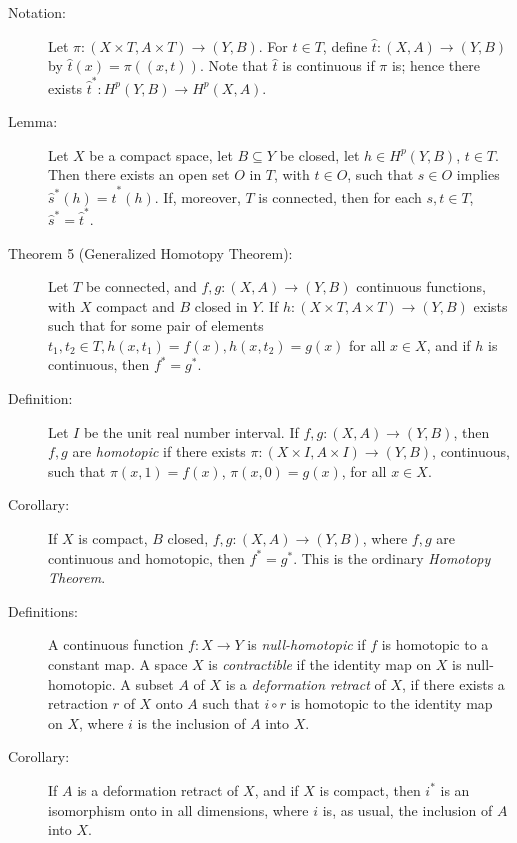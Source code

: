 \documentclass{article}
\begin{document}
\begin{description}
\item[Notation:] Let $\pi: (X \times T, A \times T) \longrightarrow (Y,B)$. For $t \in T$, define $\hat{t}: (X,A) \longrightarrow (Y,B)$ by $\hat{t}(x) = \pi ((x,t))$. Note that $\hat{t}$ is continuous if $\pi$ is; hence there exists $\hat{t}^*: H^p(Y,B) \rightarrow H^p(X,A)$.

\item[Lemma:] Let $X$ be a compact space, let $B \subseteq Y$ be closed, let $h \in H^p(Y,B)$, $t \in T$. Then there exists an open set $O$ in $T$, with $t \in O$, such that $s \in O$ implies $\hat{s}^*(h) = \hat{t}^*(h)$. If, moreover, $T$ is connected, then for each $s,t \in T$, $\hat{s}^* = \hat{t}^*$.

\item[Theorem 5 (Generalized Homotopy Theorem):] Let $T$ be connected, and $f,g: (X,A) \longrightarrow (Y,B)$ continuous functions, with $X$ compact and $B$ closed in $Y$. If $h: (X \times T, A \times T) \longrightarrow (Y,B)$ exists such that for some pair of elements $t_1,t_2 \in T, h(x,t_1) = f(x),h(x,t_2) = g(x)$ for all $x \in X$, and if $h$ is continuous, then $f^* = g^*$.

\item[Definition:] Let $I$ be the unit real number interval. If $f,g: (X,A) \longrightarrow (Y,B)$, then $f,g$ are \emph{homotopic} if there exists $\pi: (X \times I, A \times I) \longrightarrow (Y,B)$, continuous, such that $\pi (x,1) = f(x)$, $\pi(x,0) = g(x)$, for all $x \in X$.

\item[Corollary:] If $X$ is compact, $B$ closed, $f,g: (X,A) \longrightarrow (Y,B)$, where $f,g$ are continuous and homotopic, then $f^* = g^*$. This is the ordinary \emph{Homotopy Theorem}.

\item[Definitions:] A continuous function $f: X \rightarrow Y$ is \emph{null-homotopic} if $f$ is homotopic to a constant map. A space $X$ is \emph{contractible} if the identity map on $X$ is null-homotopic. A subset $A$ of $X$ is a \emph{deformation retract} of $X$, if there exists a retraction $r$ of $X$ onto $A$ such that $i \circ r$ is homotopic to the identity map on $X$, where $i$ is the inclusion of $A$ into $X$.

\item[Corollary:] If $A$ is a deformation retract of $X$, and if $X$ is compact, then $i^*$ is an isomorphism onto in all dimensions, where $i$ is, as usual, the inclusion of $A$ into $X$.


\end{description}
\end{document}
